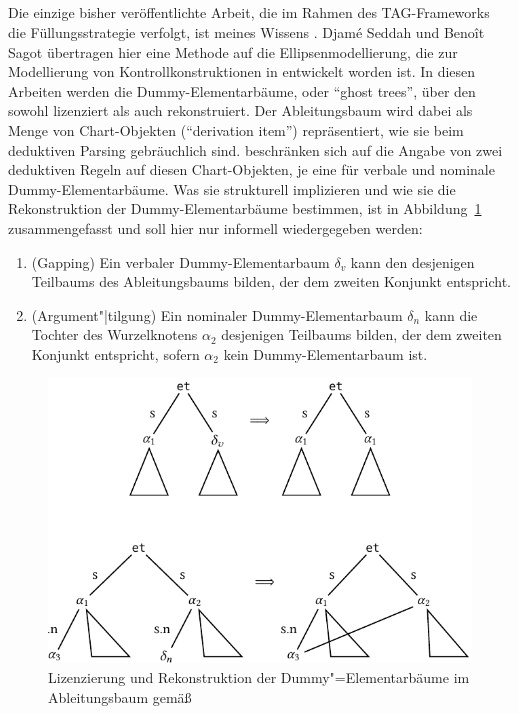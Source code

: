 \subsection{\cite{Seddah:Sagot:06}}

Die einzige bisher veröffentlichte Arbeit, die im Rahmen des TAG-Frameworks die Füllungsstrategie verfolgt, ist meines Wissens \cite{Seddah:Sagot:06}. Djam\'e Seddah und Beno\^{i}t Sagot übertragen hier eine Methode auf die Ellipsenmodellierung, die zur Modellierung von Kontrollkonstruktionen in \cite{Seddah:Gaiffe:05} entwickelt worden ist. In diesen Arbeiten werden die Dummy-Elementarbäume, oder "`ghost trees"', über den  sowohl lizenziert als auch rekonstruiert. Der Ableitungsbaum wird dabei als Menge von Chart-Objekten ("`derivation item"') repräsentiert, wie sie beim deduktiven Parsing \citep{Shieber:etal:95} gebräuchlich sind. \cite{Seddah:Sagot:06} beschränken sich auf die Angabe von zwei deduktiven Regeln auf diesen Chart-Objekten, je eine für verbale und nominale Dummy-Elementarbäume. Was sie strukturell implizieren und wie sie die Rekonstruktion der Dummy-Elementarbäume bestimmen, ist in Abbildung~\ref{fig-tag-fuellung-2} zusammengefasst und soll hier nur informell wiedergegeben werden:
\begin{enumerate}
  \item (Gapping) Ein verbaler Dummy-Elementarbaum $\delta_v$ kann den  desjenigen Teilbaums des Ableitungsbaums bilden, der dem zweiten Konjunkt entspricht.
  \item (Argument"|tilgung) Ein nominaler Dummy-Elementarbaum $\delta_n$ kann die Tochter des Wurzelknotens $\alpha_2$ desjenigen Teilbaums bilden, der dem zweiten Konjunkt entspricht, sofern $\alpha_2$ kein Dummy-Elementarbaum ist.    
\end{enumerate}
\begin{figure}[t]
\centering
\includegraphics{graphics/abb825.pdf}
\caption{\label{fig-tag-fuellung-2}Lizenzierung und Rekonstruktion der Dummy"=Elementarbäume im Ableitungsbaum gemä\ss\ \cite{Seddah:Sagot:06}}
\end{figure} 
